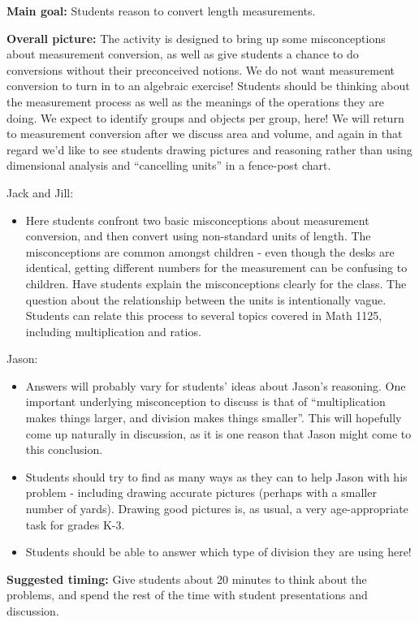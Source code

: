 \documentclass[nooutcomes,noauthor, handout]{ximera}
\begin{document}
\newpage

\begin{instructorNotes}
{\bf Main goal:} Students reason to convert length measurements.

{\bf Overall picture:} The activity is designed to bring up some misconceptions about measurement conversion, as well as give students a chance to do conversions without their preconceived notions.   We do not want measurement conversion to turn in to an algebraic exercise! Students should be thinking about the measurement process as well as the meanings of the operations they are doing. We expect to identify groups and objects per group, here! We will return to measurement conversion after we discuss area and volume, and again in that regard we'd like to see students drawing pictures and reasoning rather than using dimensional analysis and ``cancelling units'' in a fence-post chart. 

Jack and Jill:
\begin{itemize}
\item     Here students confront two basic misconceptions about measurement conversion, and then convert using non-standard units of length.  The misconceptions are common amongst children - even though the desks are identical, getting different numbers for the measurement can be confusing to children.  Have students explain the misconceptions clearly for the class.  The question about the relationship between the units is intentionally vague.  Students can relate this process to several topics covered in Math 1125, including multiplication and ratios.
\end{itemize}


Jason:

\begin{itemize}
\item     Answers will probably vary for students' ideas about Jason's reasoning.  One important underlying misconception to discuss is that of ``multiplication makes things larger, and division makes things smaller''.  This will hopefully come up naturally in discussion, as it is one reason that Jason might come to this conclusion.  
    
\item    Students should try to find as many ways as they can to help Jason with his problem - including drawing accurate pictures (perhaps with a smaller number of yards).  Drawing good pictures is, as usual, a very age-appropriate task for grades K-3.
\item Students should be able to answer which type of division they are using here!
\end{itemize}



{\bf Suggested timing:} Give students about 20 minutes to think about the problems, and spend the rest of the time with student presentations and discussion.




\end{instructorNotes}
\end{document}
